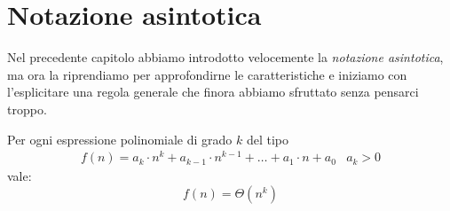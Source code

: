 \chapter{Notazione asintotica}
Nel precedente capitolo abbiamo introdotto velocemente la \emph{notazione
asintotica}, ma ora la riprendiamo per approfondirne le caratteristiche e 
iniziamo con l'esplicitare una regola generale che finora abbiamo sfruttato
senza pensarci troppo.

\begin{definition}
    Per ogni espressione polinomiale di grado $k$ del tipo
    \[\begin{array}{rc}
        f(n)=a_k\cdot n^k+a_{k-1}\cdot n^{k-1}+\dots+a_1\cdot n+a_0 & a_k>0
    \end{array}\]
    vale:
    \[f(n)=\Theta(n^k)\]
\end{definition}
